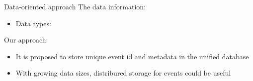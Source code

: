 \documentclass[18pt]{beamer}
\begin{document}
\begin{frame}{Data-oriented approach}
The data information:
\begin{itemize}
  \item Data types:
\end{itemize}

Our approach:
\begin{itemize}
 \item It is proposed to store unique event id and metadata in the unified database
 \item With growing data sizes, distribured storage for events could be useful
\end{itemize}
\end{frame}



\end{document}
